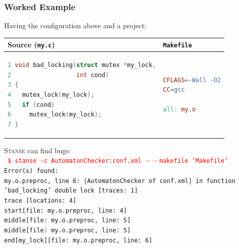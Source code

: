 \documentclass[handout,xcolor=dvipsnames]{beamer}
\begin{document}
\begin{frame}[fragile]
  \frametitle{Worked Example}
  Having the configuration above and a project:
  \begin{center}
  \begin{tabular}{|l|l|} \hline
  Source (\texttt{my.c}) & \texttt{Makefile} \\ \hline \hline
  \begin{lstlisting}[language=C]
1 void bad_locking(struct mutex *my_lock,
2                  int cond)
3 {
4   mutex_lock(my_lock);
5   if (cond)
6     mutex_lock(my_lock);
7 }
  \end{lstlisting}
  &
  \begin{lstlisting}[language=make]
CFLAGS=-Wall -O2
CC=gcc

all: my.o
  \end{lstlisting} \\ \hline
  \end{tabular}
  \end{center}

  \pause

  \textsc{Stanse} can find bugs: \\
{\scriptsize\texttt{%
\textcolor{red}{\$ stanse -c AutomatonChecker:conf.xml $--$makefile
'Makefile'} \\
\pause
Error(s) found: \\
my.o.preproc, line 6: $\{$AutomatonChecker of conf.xml$\}$ in function 'bad\_locking' double lock [traces: 1] \\
trace [locations: 4] \\
start[file: my.o.preproc, line: 4] \\
middle[file: my.o.preproc, line: 5] \\
middle[file: my.o.preproc, line: 5] \\
end[my\_lock][file: my.o.preproc, line: 6] \\
}}

\end{frame}
\end{document}
